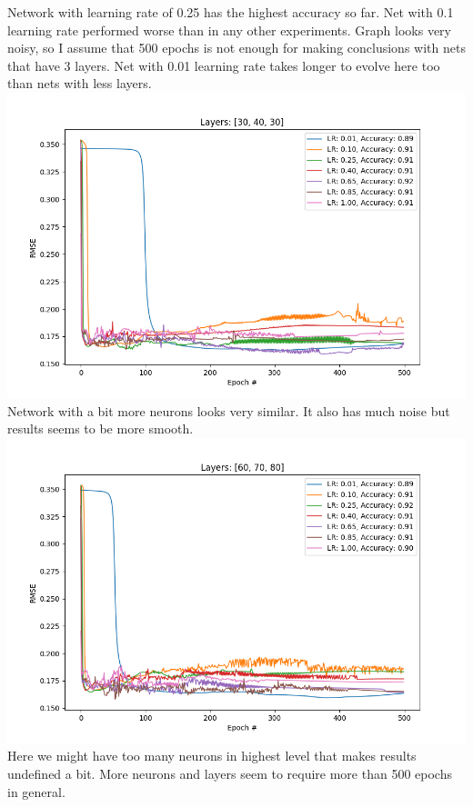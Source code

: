 \documentclass[12pt, letterpaper]{article}
\begin{document}
\begin{enumerate}[label=\Roman*.]
	  Network with learning rate of 0.25 has the highest accuracy so far.  Net with 0.1 learning rate performed worse than in any other experiments. Graph looks very noisy, so I assume  that 500 epochs is not enough for making conclusions with nets that have 3 layers. Net with 0.01 learning rate takes longer to evolve here too than nets with less layers.
	   {\center \includegraphics[scale=0.7]{../images/rmse_6.png} \\}
	   Network with a bit more neurons looks very similar. It also has much noise but results seems to be more smooth.
	   {\center \includegraphics[scale=0.7]{../images/rmse_5.png} \\}
	   Here we might have too many neurons in highest level that makes results undefined a bit. More neurons and layers seem to require more than 500 epochs in general.\\
	    

\end{enumerate}
\end{document}
